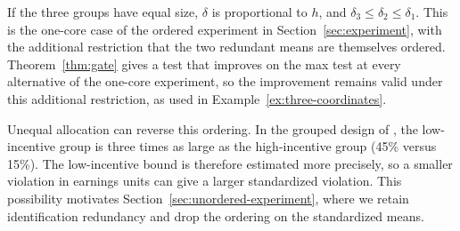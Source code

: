 \documentclass[11pt]{article}
\numberwithin{equation}{section}
\theoremstyle{definition}
\begin{document}
If the three groups have equal size, $\delta$ is proportional to $h$, and $\delta_3\le\delta_2\le\delta_1$. This is the one-core case of the ordered experiment in Section~\ref{sec:experiment}, with the additional restriction that the two redundant means are themselves ordered. Theorem~\ref{thm:gate} gives a test that improves on the max test at every alternative of the one-core experiment, so the improvement remains valid under this additional restriction, as used in Example~\ref{ex:three-coordinates}.

Unequal allocation can reverse this ordering. In the grouped design of \citet{dutz/etal:26}, the low-incentive group is three times as large as the high-incentive group (45\% versus 15\%). The low-incentive bound is therefore estimated more precisely, so a smaller violation in earnings units can give a larger standardized violation. This possibility motivates Section~\ref{sec:unordered-experiment}, where we retain identification redundancy and drop the ordering on the standardized means.

\clearpage

\end{document}
